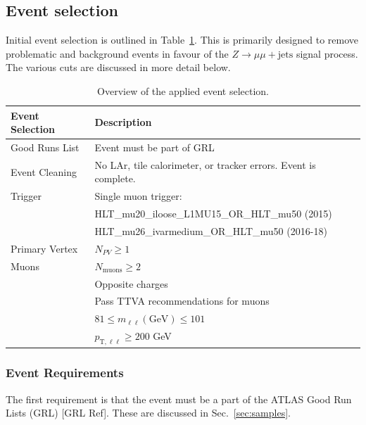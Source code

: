 \subsection{Event selection}
\label{sec:selection}

Initial event selection is outlined in Table~\ref{lab:eventsel}. This is primarily designed to remove problematic and background events in favour of the $Z\rightarrow\mu\mu + \text{jets}$ signal process. The various cuts are discussed in more detail below.

\begin{table}[h!]
    \centering
    \begin{tabular}{l|l}
         \hline
    \textbf{Event Selection} & \textbf{Description} \\ \hline
    Good Runs List & Event must be part of GRL \\ \hline
    Event Cleaning & No LAr, tile calorimeter, or tracker errors. Event is complete. \\ \hline
    Trigger & Single muon trigger: \\
    & HLT\_mu20\_iloose\_L1MU15\_OR\_HLT\_mu50 (2015) \\
    & HLT\_mu26\_ivarmedium\_OR\_HLT\_mu50 (2016-18) \\ \hline
    Primary Vertex & $N_{PV}\geq1$ \\ \hline
    Muons & $N_{\text{muons}}\geq2$ \\
          & Opposite charges \\
          & Pass TTVA recommendations for muons \\
          & $81\leq m_{\ell\ell} (\text{GeV})\leq 101$ \\
          & $p_{\text{T},\ell\ell}\geq200$ GeV \\ \hline
    \end{tabular}
    \caption{Overview of the applied event selection.}
    \label{lab:eventsel}
\end{table}

\subsubsection{Event Requirements}
The first requirement is that the event must be a part of the ATLAS Good Run Lists (GRL) [GRL Ref]. These are discussed in Sec.~\ref{sec:samples}.

